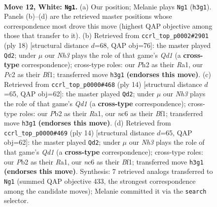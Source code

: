 \documentclass[11pt]{article}
\begin{document}
\clearpage

\begin{figure}[p]\centering
\begin{subfigure}{0.46\textwidth}\centering
\resizebox{\linewidth}{!}{%
\newchessgame
\chessboard[
  setfen={2b1qrk1/rppn1ppp/p1n1p3/3pP3/3P1P2/2N4N/PPP2KPP/R2Q1B1R w - - 8 12},
  showmover=false,
  pgfstyle=straightmove, color=movearrow, markmove={h3-g1}
]}
\caption{}
\end{subfigure}\hfill
\begin{subfigure}{0.46\textwidth}\centering
\resizebox{\linewidth}{!}{%
\newchessgame
\chessboard[
  setfen={rnbq1rk1/ppp2pbp/3p1np1/3P4/4P2P/2N1BN2/PP3PP1/R2QKB1R w KQ - 1 10},
  showmover=false,
  pgfstyle=straightmove, color=movearrow, markmove={d1-d2}
]}
\caption{}
\end{subfigure}
\\[4pt]
\begin{subfigure}{0.46\textwidth}\centering
\resizebox{\linewidth}{!}{%
\newchessgame
\chessboard[
  setfen={rnbq1rk1/p3ppbp/2pp1np1/1p6/3PP3/P1N1BN1P/1PP2PP1/R2QKB1R w KQ - 1 8},
  showmover=false,
  pgfstyle=straightmove, color=movearrow, markmove={d1-d2}
]}
\caption{}
\end{subfigure}\hfill
\begin{subfigure}{0.46\textwidth}\centering
\resizebox{\linewidth}{!}{%
\newchessgame
\chessboard[
  setfen={rnbq1rk1/p3ppbp/2pp1np1/1p6/3PP3/P1N1BN1P/1PP2PP1/R2QKB1R w KQ - 1 8},
  showmover=false,
  pgfstyle=straightmove, color=movearrow, markmove={d1-d2}
]}
\caption{}
\end{subfigure}
\caption{\textbf{Move 12, White: \texttt{Ng1}.} (a) Our position; Melanie plays \texttt{Ng1} (\texttt{h3g1}). Panels (b)--(d) are the retrieved master positions whose correspondence most drove this move (highest QAP objective among those that transfer to it). (b) Retrieved from \texttt{ccrl\_top\_p0002\#2901} (ply 18) [structural distance $d$=68, QAP obj=76]: the master played \texttt{Qd2}; under $\mu$ our \emph{Nh3} plays the role of that game's \emph{Qd1} (a \textbf{cross-type} correspondence); cross-type roles: our \emph{P}h2 as their \emph{R}a1, our \emph{P}c2 as their \emph{B}f1; transferred move \texttt{h3g1} \textbf{(endorses this move)}. (c) Retrieved from \texttt{ccrl\_top\_p0000\#468} (ply 14) [structural distance $d$=65, QAP obj=62]: the master played \texttt{Qd2}; under $\mu$ our \emph{Nh3} plays the role of that game's \emph{Qd1} (a \textbf{cross-type} correspondence); cross-type roles: our \emph{P}b2 as their \emph{R}a1, our \emph{n}c6 as their \emph{B}f1; transferred move \texttt{h3g1} \textbf{(endorses this move)}. (d) Retrieved from \texttt{ccrl\_top\_p0000\#469} (ply 14) [structural distance $d$=65, QAP obj=62]: the master played \texttt{Qd2}; under $\mu$ our \emph{Nh3} plays the role of that game's \emph{Qd1} (a \textbf{cross-type} correspondence); cross-type roles: our \emph{P}b2 as their \emph{R}a1, our \emph{n}c6 as their \emph{B}f1; transferred move \texttt{h3g1} \textbf{(endorses this move)}. Synthesis: 7 retrieved analogs transferred to \texttt{Ng1} (summed QAP objective 433, the strongest correspondence among the candidate moves); Melanie committed it via the \texttt{search} selector.}

\end{figure}
\end{document}
